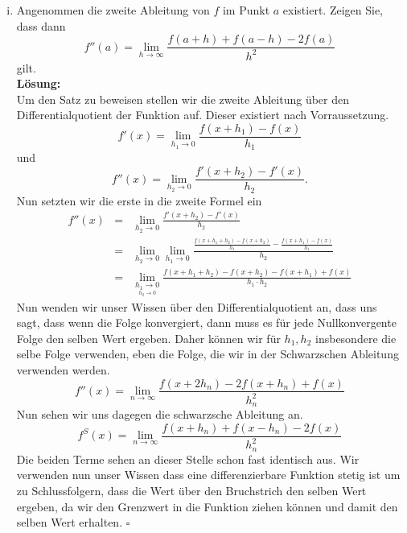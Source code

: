 \documentclass[11pt,a4paper,ngerman]{article}
\begin{document}
\begin{enumerate}[(i)]
    \item Angenommen die zweite Ableitung von $f$ im Punkt $a$ existiert. Zeigen Sie, dass dann
        $$
            f''(a) = \underset{h \rightarrow \infty}{\lim} \frac{f(a+h) + f(a-h) - 2 f(a)}{h^2}
        $$
        gilt.\\
    \textbf{Lösung:}\\
        Um den Satz zu beweisen stellen wir die zweite Ableitung über den Differentialquotient
        der Funktion auf. Dieser existiert nach Vorraussetzung.
        $$
            f'(x) = \underset{h_1 \rightarrow 0}{\lim} \frac{f(x + h_1) - f(x)}{h_1}
        $$
        und
        $$
            f''(x) = \underset{h_2 \rightarrow 0}{\lim} \frac{f'(x + h_2) - f'(x)}{h_2}.
        $$
        Nun setzten wir die erste in die zweite Formel ein
        $$\begin{array}{rcl}
            f''(x) &=& \underset{h_2 \rightarrow 0}{\lim} \frac{f'(x + h_2) - f'(x)}{h_2}\\
                &=& \underset{h_2 \rightarrow 0}{\lim} \underset{h_1 \rightarrow 0}{\lim} 
                \frac{\frac{f(x + h_1 + h_2) - f(x + h_2)}{h_1} - \frac{f(x+h_1) - f(x)}{h_1}}{h_2}\\
                &=& \underset{\underset{h_2 \rightarrow 0}{h_1 \rightarrow 0}}{\lim}
                \frac{f(x + h_1 + h_2) - f(x + h_2) - f(x+h_1) + f(x)}{h_1 \cdot h_2}
        \end{array}$$
        Nun wenden wir unser Wissen über den Differentialquotient an, dass uns sagt, dass wenn die
        Folge konvergiert, dann muss es für jede Nullkonvergente Folge den selben Wert ergeben.
        Daher können wir für $h_1,h_2$ insbesondere die selbe Folge verwenden, eben die Folge,
        die wir in der Schwarzschen Ableitung verwenden werden.
        $$
            f''(x) = \underset{n \rightarrow \infty}{\lim} \frac{f(x + 2h_n) - 2f(x+h_n) + f(x)}{h_n^2}
        $$
        Nun sehen wir uns dagegen die schwarzsche Ableitung an.
        $$
            f^S(x) = \underset{n \rightarrow \infty}{\lim} \frac{f(x+h_n) + f(x-h_n) - 2f(x)}{h_n^2}
        $$
        Die beiden Terme sehen an dieser Stelle schon fast identisch aus. Wir verwenden nun unser Wissen
        dass eine differenzierbare Funktion stetig ist um zu Schlussfolgern, dass die Wert über den
        Bruchstrich den selben Wert ergeben, da wir den Grenzwert in die Funktion ziehen können und
        damit den selben Wert erhalten.
        \mbox{} \hfill $\square$
        


\end{enumerate}
\end{document}
